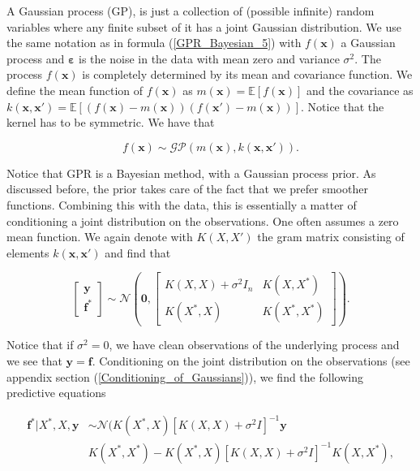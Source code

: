 \documentclass[12pt,a4paper,oneside]{book}
\begin{document}
A Gaussian process (GP), is just a collection of (possible infinite) random variables where any finite subset of it has a joint Gaussian distribution. We use the same notation as in formula (\ref{GPR_Bayesian_5}) with $f(\bm{x})$ a Gaussian process and $\bm{\varepsilon}$ is the noise in the data with mean zero and variance $\sigma^2$. The process $f(\bm{x})$ is completely determined by its mean and covariance function. We define the mean function of $f(\bm{x})$ as  $m(\bm{x}) = \mathbb{E}[f(\bm{x})]$ and the covariance as $k(\bm{x},\bm{x}') = \mathbb{E}[(f(\bm{x}) - m(\bm{x}))(f(\bm{x}') - m(\bm{x}))]$. Notice that the kernel has to be symmetric. We have that 

\begin{equation}
f(\bm{x}) \sim \mathcal{GP}(m(\bm{x}),k(\bm{x},\bm{x}')).
\end{equation}

Notice that GPR is a Bayesian method, with a Gaussian process prior. As discussed before, the prior takes care of the fact that we prefer smoother functions. Combining this with the data, this is essentially a matter of conditioning a joint distribution on the observations. One often assumes a zero mean function.  We again denote with $K(X,X')$ the gram matrix consisting of elements $k(\bm{x},\bm{x}')$ and find that
 
\begin{equation}\label{condition_gpr}
\begin{bmatrix}
    \bm{y}  \\
    \bm{f^{\ast}}
\end{bmatrix}
\sim 
\mathcal{N} \left( \bm{0}, 
\begin{bmatrix}
    K(X,X) + \sigma^2 I_n & K(X,X^{\ast})\\
    K(X^{\ast},X)  & K(X^{\ast},X^{\ast})
\end{bmatrix} 
\right).
\end{equation} 

Notice that if $\sigma^2 = 0$, we have clean observations of the underlying process and we see that $\bm{y} = \bm{f}$. Conditioning on the joint distribution on the observations (see appendix section (\ref{Conditioning_of_Gaussians})), we find the following predictive equations 

\begin{equation}\label{function_1_gpr}
\boxed{\begin{aligned}
\bm{f^{\ast}} | X^{\ast}, X, \bm{y} &\sim \mathcal{N} (   K(X^{\ast},X)[K(X,X) + \sigma^2 I]^{-1} \bm{y} \\  
& K(X^{\ast}, X^{\ast}) - K(X^{\ast},X)  [K(X,X) + \sigma^2 I]^{-1}  K(X,X^{\ast} ),
\end{aligned}}
\end{equation}
\end{document}
